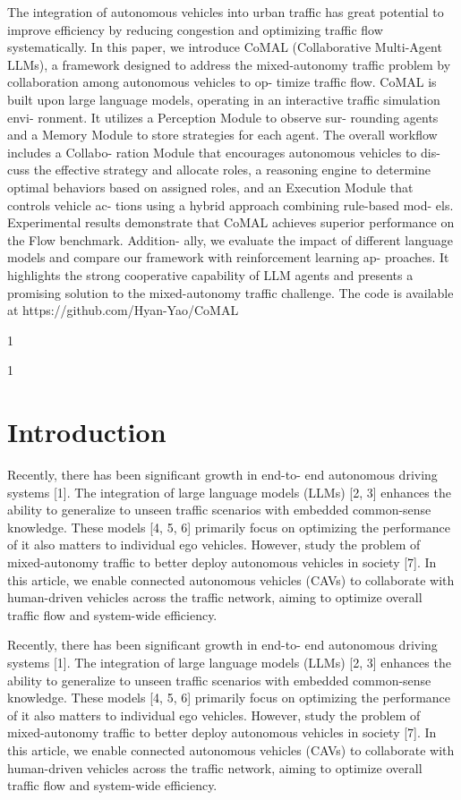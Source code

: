\documentclass[12pt]{article}
\begin{document}
The integration of autonomous vehicles into urban traffic has
great potential to improve efficiency by reducing congestion
and optimizing traffic flow systematically. In this paper, we
introduce CoMAL (Collaborative Multi-Agent LLMs), a
framework designed to address the mixed-autonomy traffic
problem by collaboration among autonomous vehicles to op-
timize traffic flow. CoMAL is built upon large language
models, operating in an interactive traffic simulation envi-
ronment.
It utilizes a Perception Module to observe sur-
rounding agents and a Memory Module to store strategies
for each agent. The overall workflow includes a Collabo-
ration Module that encourages autonomous vehicles to dis-
cuss the effective strategy and allocate roles, a reasoning
engine to determine optimal behaviors based on assigned
roles, and an Execution Module that controls vehicle ac-
tions using a hybrid approach combining rule-based mod-
els. Experimental results demonstrate that CoMAL achieves
superior performance on the Flow benchmark. Addition-
ally, we evaluate the impact of different language models
and compare our framework with reinforcement learning ap-
proaches.
It highlights the strong cooperative capability
of LLM agents and presents a promising solution to the
mixed-autonomy traffic challenge. The code is available at
https://github.com/Hyan-Yao/CoMAL


1


1


\section{Introduction}


Recently, there has been significant growth in end-to-
end autonomous driving systems [1]. The integration
of large language models (LLMs) [2, 3] enhances the
ability to generalize to unseen traffic scenarios with
embedded common-sense knowledge. These models [4,
5, 6] primarily focus on optimizing the performance of
it also matters to
individual ego vehicles. However,
study the problem of mixed-autonomy traffic to better
deploy autonomous vehicles in society [7]. In this article,
we enable connected autonomous vehicles (CAVs) to
collaborate with human-driven vehicles across the traffic
network, aiming to optimize overall traffic flow and
system-wide efficiency.


Recently, there has been significant growth in end-to-
end autonomous driving systems [1]. The integration
of large language models (LLMs) [2, 3] enhances the
ability to generalize to unseen traffic scenarios with
embedded common-sense knowledge. These models [4,
5, 6] primarily focus on optimizing the performance of
it also matters to
individual ego vehicles. However,
study the problem of mixed-autonomy traffic to better
deploy autonomous vehicles in society [7]. In this article,
we enable connected autonomous vehicles (CAVs) to
collaborate with human-driven vehicles across the traffic
network, aiming to optimize overall traffic flow and
system-wide efficiency.
\end{document}
